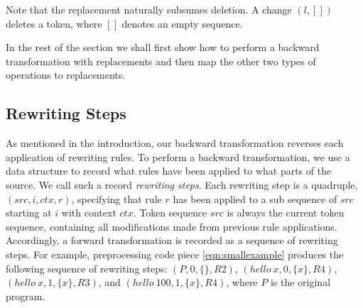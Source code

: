 Note that the replacement naturally subsumes deletion. A change $(l,
[])$ deletes a token, where $[]$ denotes an empty sequence.

In the rest of the section we shall first show how to perform a
backward transformation with replacements and then map the other two
types of operations to replacements. %

\subsection{Rewriting Steps}\label{sec:steps}
As mentioned in the introduction, our backward transformation reverses
each application of rewriting rules. To perform a backward
transformation, we use a data structure to record what rules have been
applied to what parts of the source. We call such a record  \emph{rewriting steps}. Each rewriting
step is a quadruple, $(src, i, ctx, r)$, specifying that rule $r$ has been
applied to a sub sequence of $src$ starting at $i$ with context $ctx$. Token
sequence $src$ is always the current token sequence, containing all
modifications made from previous rule applications.
Accordingly, a forward transformation is recorded as a sequence of
rewriting steps. For example, preprocessing code piece \ref{eqn:smallexample}
produces the following sequence of rewriting steps:
$(P, 0, \{\}, R2)$, $(hello\ x, 0, \{x\}, R4)$, $(hello\ x, 1, \{x\}, R3)$, and
$(hello\ 100, 1, \{x\}, R4)$, where $P$ is the original program.



